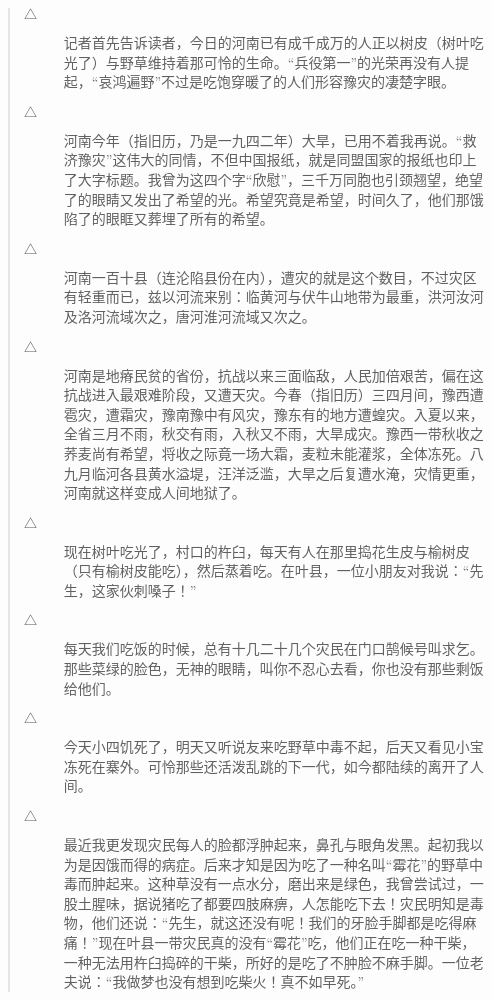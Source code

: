 \begin{quote}
	\begin{description}
		\item [$\bigtriangleup$] 记者首先告诉读者，今日的河南已有成千成万的人正以树皮（树叶吃光了）与野草维持着那可怜的生命。“兵役第一”的光荣再没有人提起，“哀鸿遍野”不过是吃饱穿暖了的人们形容豫灾的凄楚字眼。\\

		\item [$\bigtriangleup$] 河南今年（指旧历，乃是一九四二年）大旱，已用不着我再说。“救济豫灾”这伟大的同情，不但中国报纸，就是同盟国家的报纸也印上了大字标题。我曾为这四个字“欣慰”，三千万同胞也引颈翘望，绝望了的眼睛又发出了希望的光。希望究竟是希望，时间久了，他们那饿陷了的眼眶又葬埋了所有的希望。\\

		\item [$\bigtriangleup$] 河南一百十县（连沦陷县份在内），遭灾的就是这个数目，不过灾区有轻重而已，兹以河流来别：临黄河与伏牛山地带为最重，洪河汝河及洛河流域次之，唐河淮河流域又次之。\\

		\item [$\bigtriangleup$] 河南是地瘠民贫的省份，抗战以来三面临敌，人民加倍艰苦，偏在这抗战进入最艰难阶段，又遭天灾。今春（指旧历）三四月间，豫西遭雹灾，遭霜灾，豫南豫中有风灾，豫东有的地方遭蝗灾。入夏以来，全省三月不雨，秋交有雨，入秋又不雨，大旱成灾。豫西一带秋收之荞麦尚有希望，将收之际竟一场大霜，麦粒未能灌浆，全体冻死。八九月临河各县黄水溢堤，汪洋泛滥，大旱之后复遭水淹，灾情更重，河南就这样变成人间地狱了。\\

		\item [$\bigtriangleup$] 现在树叶吃光了，村口的杵臼，每天有人在那里捣花生皮与榆树皮（只有榆树皮能吃），然后蒸着吃。在叶县，一位小朋友对我说：“先生，这家伙刺嗓子！”\\

		\item [$\bigtriangleup$] 每天我们吃饭的时候，总有十几二十几个灾民在门口鹄候号叫求乞。那些菜绿的脸色，无神的眼睛，叫你不忍心去看，你也没有那些剩饭给他们。\\

		\item [$\bigtriangleup$] 今天小四饥死了，明天又听说友来吃野草中毒不起，后天又看见小宝冻死在寨外。可怜那些还活泼乱跳的下一代，如今都陆续的离开了人间。\\

		\item [$\bigtriangleup$] 最近我更发现灾民每人的脸都浮肿起来，鼻孔与眼角发黑。起初我以为是因饿而得的病症。后来才知是因为吃了一种名叫“霉花”的野草中毒而肿起来。这种草没有一点水分，磨出来是绿色，我曾尝试过，一股土腥味，据说猪吃了都要四肢麻痹，人怎能吃下去！灾民明知是毒物，他们还说：“先生，就这还没有呢！我们的牙脸手脚都是吃得麻痛！”现在叶县一带灾民真的没有“霉花”吃，他们正在吃一种干柴，一种无法用杵臼捣碎的干柴，所好的是吃了不肿脸不麻手脚。一位老夫说：“我做梦也没有想到吃柴火！真不如早死。”\\


\end{description}
\end{quote}
